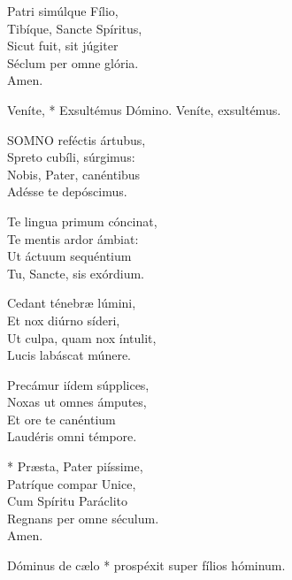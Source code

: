 Patri simúlque Fílio,\\
Tibíque, Sancte Spíritus,\\
Sicut fuit, sit júgiter\\
Séclum per omne glória.\\
Amen.



 Veníte, * Exsultémus Dómino.  Veníte, exsultémus.



\lettrine[lines=2]{S}{OMNO} reféctis ártubus,\\
Spreto cubíli, súrgimus:\\
Nobis, Pater, canéntibus\\
Adésse te depóscimus.

Te lingua primum cóncinat,\\
Te mentis ardor ámbiat:\\
Ut áctuum sequéntium\\
Tu, Sancte, sis exórdium.

Cedant ténebræ lúmini,\\
Et nox diúrno síderi,\\
Ut culpa, quam nox íntulit,\\
Lucis labáscat múnere.

Precámur iídem súpplices,\\
Noxas ut omnes ámputes,\\
Et ore te canéntium\\
Laudéris omni témpore.

* Præsta, Pater piíssime,\\
Patríque compar Unice,\\
Cum Spíritu Paráclito\\
Regnans per omne séculum.\\
Amen.


 Dóminus de cælo * prospéxit super fílios hóminum.


